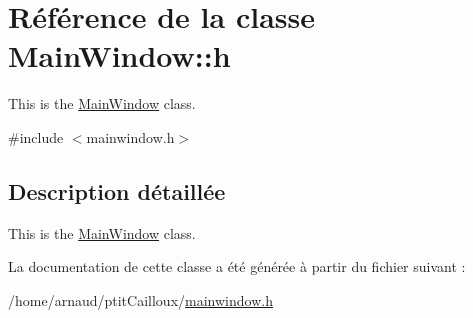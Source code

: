 \hypertarget{class_main_window_1_1h}{\section{Référence de la classe Main\-Window\-:\-:h}
\label{class_main_window_1_1h}
}


This is the \hyperlink{class_main_window}{Main\-Window} class.  




{\ttfamily \#include $<$mainwindow.\-h$>$}



\subsection{Description détaillée}
This is the \hyperlink{class_main_window}{Main\-Window} class. 

La documentation de cette classe a été générée à partir du fichier suivant \-:\begin{DoxyCompactItemize}
\item 
/home/arnaud/ptit\-Cailloux/\hyperlink{mainwindow_8h}{mainwindow.\-h}\end{DoxyCompactItemize}
